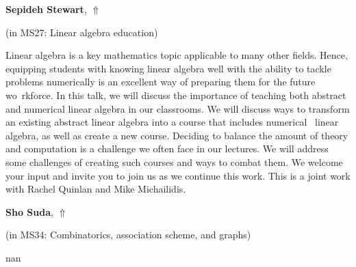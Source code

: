\documentclass[ILAS2025-program.tex]{subfiles}
\begin{document}
     \hypertarget{down0333}{}\begin{ilasabstract}
    
    \textbf{Sepideh Stewart},  \hfill \hyperlink{up0333}{$\Uparrow$}
    
    (in {\color{mstitle}MS27: Linear algebra education})
        
        \mtskip
    Linear algebra is a key mathematics topic applicable to many other fields. Hence, equipping students with knowing linear algebra well with the ability to tackle problems numerically is an excellent way of preparing them for the future wo\
rkforce.  In this talk, we will discuss the importance of teaching both abstract and numerical linear algebra in our classrooms. We will discuss ways to transform an existing abstract linear algebra into a course that includes numerical \
linear algebra, as well as create a new course. Deciding to balance the amount of theory and computation is a challenge we often face in our lectures.  We will address some challenges of creating such courses and ways to combat them.
We welcome your input and invite you to join us as we continue this work. This is a joint work with Rachel Quinlan and Mike Michailidis.\end{ilasabstract}
     \hypertarget{down0323}{}\begin{ilasabstract}
   \talktitle{nan}
    
    \textbf{Sho Suda},  \hfill \hyperlink{up0323}{$\Uparrow$}
    
    (in {\color{mstitle}MS34: Combinatorics, association scheme, and graphs})
        
        \mtskip
    nan\end{ilasabstract}
\end{document}
